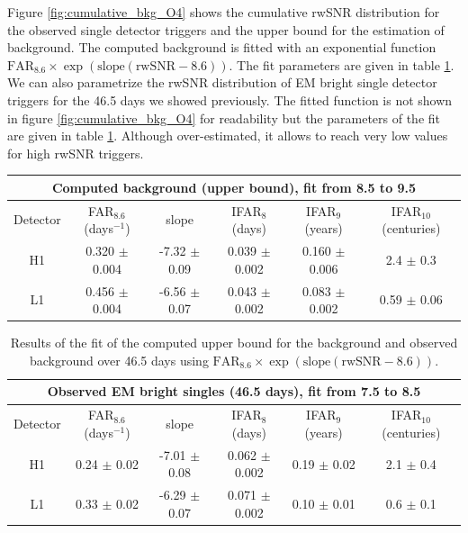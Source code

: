 Figure \ref{fig:cumulative_bkg_O4} shows the cumulative rwSNR distribution for the observed single detector triggers and the upper bound for the estimation of background.
The computed background is fitted with an exponential function $\text{FAR$_{8.6}$}\times\exp(\text{slope}(\text{rwSNR}-8.6))$.
The fit parameters are given in table \ref{tab:fitO4}.
We can also parametrize the rwSNR distribution of EM bright single detector triggers for the 46.5 days we showed previously.
The fitted function is not shown in figure \ref{fig:cumulative_bkg_O4} for readability but the parameters of the fit are given in table \ref{tab:fitO4}.
Although over-estimated, it allows to reach very low values for high rwSNR triggers.
%
\begin{table}[h]
  \centering
  \begin{tabular}{c|c|c|c|c|c}
    \multicolumn{6}{c}{Computed background (upper bound), fit from 8.5 to 9.5} \\ \hline
    Detector & FAR$_{8.6}$ (days$^{-1}$) & slope & IFAR$_8$ (days) & IFAR$_9$ (years) & IFAR$_{10}$ (centuries) \\ \hline
    H1 & 0.320 $\pm$ 0.004 & -7.32 $\pm$ 0.09 & 0.039 $\pm$ 0.002 & 0.160 $\pm$ 0.006 & 2.4 $\pm$ 0.3 \\
    L1 & 0.456 $\pm$ 0.004 & -6.56 $\pm$ 0.07 & 0.043 $\pm$ 0.002 & 0.083 $\pm$ 0.002 & 0.59 $\pm$ 0.06 \\
  \end{tabular}
\end{table}
\begin{table}[h]
  \centering
  \begin{tabular}{c|c|c|c|c|c}
    \multicolumn{6}{c}{Observed EM bright singles (46.5 days), fit from 7.5 to 8.5}\\ \hline
    Detector & FAR$_{8.6}$ (days$^{-1}$) & slope & IFAR$_8$ (days) & IFAR$_9$ (years) & IFAR$_{10}$ (centuries) \\ \hline
    H1 & 0.24 $\pm$ 0.02 & -7.01 $\pm$ 0.08 & 0.062 $\pm$ 0.002 & 0.19 $\pm$ 0.02 & 2.1 $\pm$ 0.4 \\
    L1 & 0.33 $\pm$ 0.02 & -6.29 $\pm$ 0.07 & 0.071 $\pm$ 0.002 & 0.10 $\pm$ 0.01 & 0.6 $\pm$ 0.1 \\
  \end{tabular}
  \caption{Results of the fit of the computed upper bound for the background and observed background over 46.5 days using $\text{FAR$_{8.6}$}\times\exp(\text{slope}(\text{rwSNR}-8.6))$.}
  \label{tab:fitO4}
\end{table}

